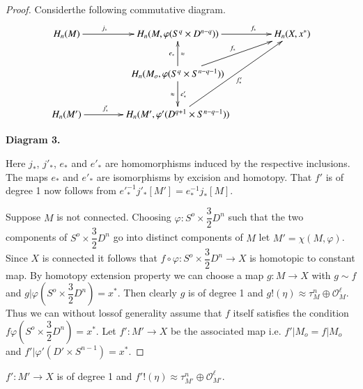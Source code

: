 \begin{proof}%
Consider\pageoriginale the following commutative diagram.  
\[
\xymatrix@R=0.9cm@C=1.4cm{
H_n(M) \ar[r]^>>>>>>>>>>>{j_*} & H_n (M, \varphi (S^q \times D^{n-q}))
\ar[r]^>>>>>>>{f_*} & H_n(X,x^\ast) \\
& H_n (M_o, \varphi (S^q \times S^{n-q-1})) \ar[u]^{e_*}_\approx
\ar[ur]^{f_*} \ar[d]^{e'_*}_{\approx} &   \\
H_n(M') \ar[r]^>>>>>>>{j'_*} & H_n (M', \varphi' (D^{q+1} \times S^{n-q-1}))
\ar[uur]_{f'_*}  & 
}
\]
\begin{center}
{\bf Diagram 3.}
\end{center}

Here $j_*$, $j'_*$,  $e_*$ and $e'_*$ are homomorphisms induced by the
respective inclusions. The maps $e_*$ and $e'_*$ are isomorphisms by
excision and homotopy. That $f'$ is of degree 1 now follows from
$e'^{-1}_* j'_{*} [M'] = e^{-1}_* j_* [M]$.  

Suppose $M$ is not connected. Choosing $\varphi: S^o \times
\dfrac{3}{2}D^n$ such that the two components of $S^o \times
\dfrac{3}{2}D^n$ go into distinct components of $M$ let $M' =
\chi(M,\varphi)$. Since $X$ is connected it follows that $f \circ\varphi:
S^o \times \dfrac{3}{2} D^n \rightarrow X$ is homotopic to constant
map. By homotopy extension property we can choose a map $g: M
\rightarrow X$ with $g\sim f$ and $g|\varphi (S^o \times
\dfrac{3}{2}D^n) = x^*$. Then clearly $g$ is of degree 1 and $g!(\eta)
\approx \tau^n_M \oplus \mathscr{O}^\ell_M$. Thus we can without
loss\pageoriginale of 
generality assume that $f$ itself satisfies the condition $f \varphi
(S^o \times \dfrac{3}{2}D^n) = x^*$. Let $f': M' \rightarrow X$ be the
associated map i.e. $f' | M_o = f | M_o$ and $f'| \varphi'(D' \times
S^{n-1}) = x^*$. 
\end{proof}

\begin{lemma}\label{chap1:lem3.4}%
$f': M' \rightarrow X$ is of degree 1 and $f'! (\eta) \approx
  \tau^n_{M'} \oplus \mathscr{O}^\ell_{M'}$.  
\end{lemma}


